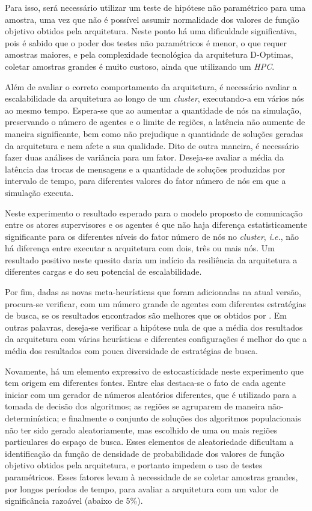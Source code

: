 Para isso, será necessário utilizar um teste de hipótese não paramétrico para uma amostra, uma vez que não é possível assumir normalidade dos valores de função objetivo obtidos pela arquitetura. Neste ponto há uma dificuldade significativa, pois é sabido que o poder dos testes não paramétricos é menor, o que requer amostras maiores, e pela complexidade tecnológica da arquitetura D-Optimas, coletar amostras grandes é muito custoso, ainda que utilizando um \textit{HPC}. 

Além de avaliar o correto comportamento da arquitetura, é necessário avaliar a escalabilidade da arquitetura ao longo de um \textit{cluster}, executando-a em vários nós ao mesmo tempo. Espera-se que ao aumentar a quantidade de nós na simulação, preservando o número de agentes e o limite de regiões, a latência não aumente de maneira significante, bem como não prejudique a quantidade de soluções geradas da arquitetura e nem afete a sua qualidade. Dito de outra maneira, é necessário fazer duas análises de variância para um fator. Deseja-se avaliar a média da latência das trocas de mensagens e a quantidade de soluções produzidas por intervalo de tempo, para diferentes valores do fator número de nós em que a simulação executa. 

Neste experimento o resultado esperado para o modelo proposto de comunicação entre os atores supervisores e os agentes é que não haja diferença estatisticamente significante para os diferentes níveis do fator número de nós no \textit{cluster}, \textit{i.e.}, não há diferença entre executar a arquitetura com dois, três ou mais nós. Um resultado positivo neste quesito daria um indício da resiliência da arquitetura a diferentes cargas e do seu potencial de escalabilidade. 

Por fim, dadas as novas meta-heurísticas que foram adicionadas na atual versão, procura-se verificar, com um número grande de agentes com diferentes estratégias de busca, se os resultados encontrados são melhores que os obtidos por . Em outras palavras, deseja-se verificar a hipótese nula de que a média dos resultados da arquitetura com várias heurísticas e diferentes configurações é melhor do que a média dos resultados com pouca diversidade de estratégias de busca.

Novamente, há um elemento expressivo de estocasticidade neste experimento que tem origem em diferentes fontes. Entre elas destaca-se o fato de cada agente iniciar com um gerador de números aleatórios diferentes, que é utilizado para a tomada de decisão dos algoritmos; as regiões se agruparem de maneira não-determinística; e finalmente o conjunto de soluções dos algoritmos populacionais não ter sido gerado aleatoriamente, mas escolhido de uma ou mais regiões particulares do espaço de busca. Esses elementos de aleatoriedade dificultam a identificação da função de densidade de probabilidade dos valores de função objetivo obtidos pela arquitetura, e portanto impedem o uso de testes paramétricos. Esses fatores levam à necessidade de se coletar amostras grandes, por longos períodos de tempo, para avaliar a arquitetura com um valor de significância razoável (abaixo de 5\%).

